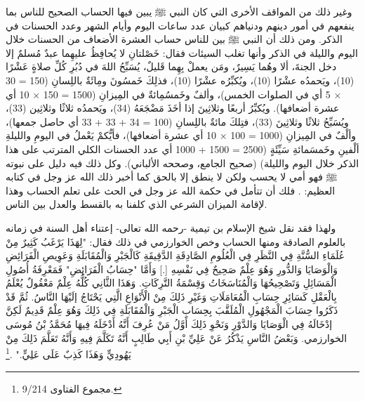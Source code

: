 وغير ذلك من المواقف الأخرى التي كان النبي ﷺ يبين فيها الحساب الصحيح للناس بما ينفعهم في أمور دينهم ودنياهم كبيان عدد ساعات اليوم وأيام الشهر وعدد الحسنات في الذكر. ومن ذلك أن النبي ﷺ  بين للناس حساب العشرة الأضعاف من الحسنات خلال اليوم والليلة في الذكر وأنها تغلب السيئات فقال: خَصْلتانِ لا يُحافِظُ عليهِما عبدٌ مُسلمٌ إلا دخل الجنةَ، ألا وهُما يَسِيرٌ، ومَن يعملْ بِهِما قَليلٌ، يُسَبِّحُ اللهَ في دُبُرِ كُلِّ صلاةٍ عَشْرًا (10)، ويَحمدُه عشْرًا (10)، ويُكبِّرُه عشْرًا (10)، فذلِكَ خَمسُونَ ومِائَةٌ باللِسانِ (150 = 30 × 5 أي في الصلوات الخمس)، وألفٌ وخَمسُمِائةٌ في المِيزانِ (1500 = 150 × 10 أي عشرة أضعافها). ويُكبِّرُ أربعًا وثلاثِينَ إذا أخَذَ مَضْجَعَهُ (34)، ويَحمدُه ثلاثًا وثلاثِين (33)، ويُسَبِّحُ ثلاثًا وثلاثِينَ (33)، فتِلكَ مائةٌ باللِسانِ (100 = 34 + 33 + 33 أي حاصل جمعها)، وألْفٌ في المِيزانِ (1000 = 100 × 10 أي عشرة أضعافها)، فأيُّكمْ يَعْملُ في اليومِ والليلةِ ألْفينِ وخَمسَمائةِ سَيِّئَةٍ (2500 = 1500 + 1000 أي عدد الحسنات الكلي المترتب على هذا الذكر خلال اليوم والليلة) {\footnotesize (صحيح الجامع، وصححه الألباني)}. وكل ذلك فيه دليل على نبوته ﷺ فهو أمي لا يحسب ولكن لا ينطق إلا بالحق كما أخبر ذلك الله عز وجل في كتابه العظيم:
\quranayah*[53][3-4]{\footnotesize \surahname*[53]}. فلك أن تتأمل في حكمة الله عز وجل في الحث على تعلم الحساب وهذا لإقامة الميزان الشرعي الذي كلفنا به بالقسط والعدل بين الناس.

ولهذا فقد نقل شيخ الإسلام بن تيمية -رحمه الله تعالى- إعتناء أهل السنة في زمانه بالعلوم الصادقة ومنها الحساب وخص الخوارزمي في ذلك فقال: 
"لِهَذَا يَرْغَبُ كَثِيرٌ مِنْ عُلَمَاءِ السُّنَّةِ فِي النَّظَرِ فِي الْعُلُومِ الصَّادِقَةِ الدَّقِيقَةِ كَالْجَبْرِ وَالْمُقَابَلَةِ وَعَوِيصِ الْفَرَائِضِ وَالْوَصَايَا وَالدُّورِ وَهُوَ عِلْمٌ صَحِيحٌ فِي نَفْسِهِ [.] وَأَمَّا "حِسَابُ الْفَرَائِضِ" فَمَعْرِفَةُ أُصُولِ الْمَسَائِلِ وَتَصْحِيحُهَا وَالْمُنَاسَخَاتُ وَقِسْمَةُ التَّرِكَاتِ. وَهَذَا الثَّانِي كُلُّهُ عِلْمٌ مَعْقُولٌ يُعْلَمُ بِالْعَقْلِ كَسَائِرِ حِسَابِ الْمُعَامَلَاتِ وَغَيْرِ ذَلِكَ مِنْ الْأَنْوَاعِ الَّتِي يَحْتَاجُ إلَيْهَا النَّاسُ. ثُمَّ قَدْ ذَكَرُوا حِسَابَ الْمَجْهُولِ الْمُلَقَّبَ بِحِسَابِ الْجَبْرِ وَالْمُقَابَلَةِ فِي ذَلِكَ وَهُوَ عِلْمٌ قَدِيمٌ لَكِنَّ إدْخَالَهُ فِي الْوَصَايَا وَالدَّوْرِ وَنَحْوِ ذَلِكَ أَوَّلُ مَنْ عُرِفَ أَنَّهُ أَدْخَلَهُ فِيهَا مُحَمَّدُ بْنُ مُوسَى الخوارزمي. وَبَعْضُ النَّاسِ يَذْكُرُ عَنْ عَلِيِّ بْنِ أَبِي طَالِبٍ أَنَّهُ تَكَلَّمَ فِيهِ وَأَنَّهُ تَعَلَّمَ ذَلِكَ مِنْ يَهُودِيٍّ وَهَذَا كَذِبٌ عَلَى عَلِيٍّ."
\href{https://shamela.ws/book/7289/4479#p2}{\faExternalLink} \cite{ibnTaimia_Majmoo}.\footnote{مجموع الفتاوى 9/214.} 

